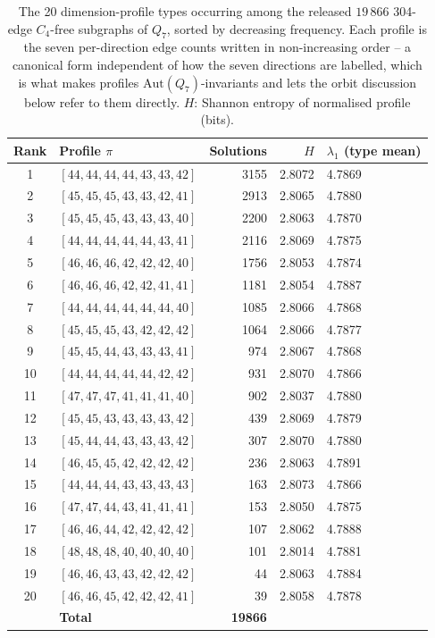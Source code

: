 \documentclass[12pt,a4paper]{article}
\theoremstyle{definition}
\begin{document}
\begin{table}[ht]
\centering\small
\caption{The 20 dimension-profile types occurring among the released
  $19\,866$ 304-edge $C_4$-free subgraphs of $Q_7$, sorted by decreasing
  frequency. Each profile is the seven
  per-direction edge counts written in non-increasing order -- a canonical
  form independent of how the seven directions are labelled, which is what
  makes profiles $\mathrm{Aut}(Q_7)$-invariants and lets the orbit
  discussion below refer to them directly.
  $H$: Shannon entropy of normalised profile (bits).}
\label{tab:types}\medskip
\begin{tabular}{clrrl}
\toprule
Rank & Profile $\pi$ & Solutions & $H$ & $\lambda_1$ (type mean)\\
\midrule
 1 & $[44,44,44,44,43,43,42]$ & 3155 & 2.8072 & 4.7869\\
 2 & $[45,45,45,43,43,42,41]$ & 2913 & 2.8065 & 4.7880\\
 3 & $[45,45,45,43,43,43,40]$ & 2200 & 2.8063 & 4.7870\\
 4 & $[44,44,44,44,44,43,41]$ & 2116 & 2.8069 & 4.7875\\
 5 & $[46,46,46,42,42,42,40]$ & 1756 & 2.8053 & 4.7874\\
 6 & $[46,46,46,42,42,41,41]$ & 1181 & 2.8054 & 4.7887\\
 7 & $[44,44,44,44,44,44,40]$ & 1085 & 2.8066 & 4.7868\\
 8 & $[45,45,45,43,42,42,42]$ & 1064 & 2.8066 & 4.7877\\
 9 & $[45,45,44,43,43,43,41]$ &  974 & 2.8067 & 4.7868\\
10 & $[44,44,44,44,44,42,42]$ &  931 & 2.8070 & 4.7866\\
11 & $[47,47,47,41,41,41,40]$ &  902 & 2.8037 & 4.7880\\
12 & $[45,45,43,43,43,43,42]$ &  439 & 2.8069 & 4.7879\\
13 & $[45,44,44,43,43,43,42]$ &  307 & 2.8070 & 4.7880\\
14 & $[46,45,45,42,42,42,42]$ &  236 & 2.8063 & 4.7891\\
15 & $[44,44,44,43,43,43,43]$ &  163 & 2.8073 & 4.7866\\
16 & $[47,47,44,43,41,41,41]$ &  153 & 2.8050 & 4.7875\\
17 & $[46,46,44,42,42,42,42]$ &  107 & 2.8062 & 4.7888\\
18 & $[48,48,48,40,40,40,40]$ &  101 & 2.8014 & 4.7881\\
19 & $[46,46,43,43,42,42,42]$ &   44 & 2.8063 & 4.7884\\
20 & $[46,46,45,42,42,42,41]$ &   39 & 2.8058 & 4.7878\\
\midrule
   & \textbf{Total}           & \textbf{19866}\\
\bottomrule
\end{tabular}
\end{table}
\end{document}
